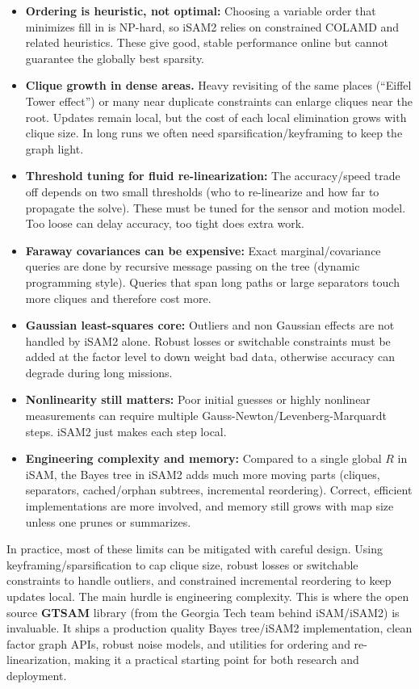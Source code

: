 \begin{itemize}
  \item \textbf{Ordering is heuristic, not optimal:} Choosing a variable order that minimizes fill in is NP-hard, so iSAM2 relies on constrained COLAMD and related heuristics. These give good, stable performance online but cannot guarantee the globally best sparsity.

  \item \textbf{Clique growth in dense areas.} Heavy revisiting of the same places (``Eiffel Tower effect'') or many near duplicate constraints can enlarge cliques near the root. Updates remain local, but the cost of each local elimination grows with clique size. In long runs we often need sparsification/keyframing to keep the graph light.

  \item \textbf{Threshold tuning for fluid re-linearization:} The accuracy/speed trade off depends on two small thresholds (who to re-linearize and how far to propagate the solve). These must be tuned for the sensor and motion model. Too loose can delay accuracy, too tight does extra work.

  \item \textbf{Faraway covariances can be expensive:} Exact marginal/covariance queries are done by recursive message passing on the tree (dynamic programming style). Queries that span long paths or large separators touch more cliques and therefore cost more.

  \item \textbf{Gaussian least-squares core:} Outliers and non Gaussian effects are not handled by iSAM2 alone. Robust losses or switchable constraints must be added at the factor level to down weight bad data, otherwise accuracy can degrade during long missions.

  \item \textbf{Nonlinearity still matters:} Poor initial guesses or highly nonlinear measurements can require multiple Gauss-Newton/Levenberg-Marquardt steps. iSAM2 just makes each step local.

  \item \textbf{Engineering complexity and memory:} Compared to a single global $R$ in iSAM, the Bayes tree in iSAM2 adds much more moving parts (cliques, separators, cached/orphan subtrees, incremental reordering). Correct, efficient implementations are more involved, and memory still grows with map size unless one prunes or summarizes.
\end{itemize}
\noindent 
In practice, most of these limits can be mitigated with careful design. Using keyframing/sparsification to cap clique size, robust losses or switchable constraints to handle outliers, and constrained incremental reordering to keep updates local. The main hurdle is engineering complexity. This is where the open source \textbf{GTSAM} library (from the Georgia Tech team behind iSAM/iSAM2) is invaluable. It ships a production quality Bayes tree/iSAM2 implementation, clean factor graph APIs, robust noise models, and utilities for ordering and re-linearization, making it a practical starting point for both research and deployment.

